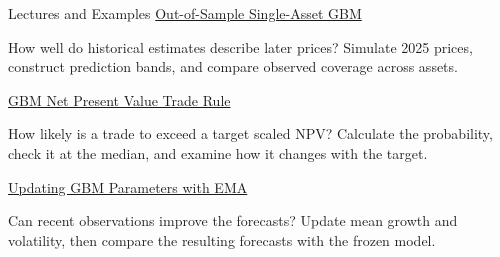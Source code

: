 \documentclass[aspectratio=169,11pt]{beamer}
\begin{document}
\begin{frame}{Lectures and Examples}
\textbf{} \href{https://github.com/varnerlab/CHEME-5660-CourseRepository-Fall-2026/blob/main/lectures/week-5/L5a/CHEME-5660-L5a-Example-OOS-SAGBM-Fall-2026.ipynb}{Out-of-Sample Single-Asset GBM}

How well do historical estimates describe later prices? Simulate 2025 prices,
construct prediction bands, and compare observed coverage across assets.

\vspace{0.8em}
\textbf{} \href{https://github.com/varnerlab/CHEME-5660-CourseRepository-Fall-2026/blob/main/lectures/week-5/L5a/CHEME-5660-L5a-Example-GBM-NPV-TradeRule-Fall-2026.ipynb}{GBM Net Present Value Trade Rule}

How likely is a trade to exceed a target scaled NPV? Calculate the probability,
check it at the median, and examine how it changes with the target.

\vspace{0.8em}
\textbf{} \href{https://github.com/varnerlab/CHEME-5660-CourseRepository-Fall-2026/blob/main/lectures/week-5/L5a/CHEME-5660-L5a-Example-EMA-SAGBM-Fall-2026.ipynb}{Updating GBM Parameters with EMA}

Can recent observations improve the forecasts? Update mean growth and volatility,
then compare the resulting forecasts with the frozen model.
\end{frame}
\end{document}
